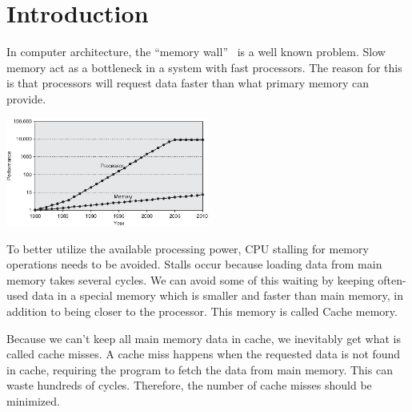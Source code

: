 \section{Introduction} %


In computer architecture, the ``memory wall''~\cite{wulf_mckee_1995}
is a well known problem. Slow memory act as a bottleneck in a system
with fast processors. The reason for this is that processors will
request data faster than what primary memory can provide. %

\begin{center}
  \includegraphics[width=0.5\textwidth]{graphs/memorywall}
\end{center}

To better utilize the available processing power, CPU stalling for
memory operations needs to be avoided. Stalls occur because loading
data from main memory takes several cycles. We can avoid some of this
waiting by keeping often-used data in a special memory which is
smaller and faster than main memory, in addition to being closer to
the processor. This memory is called Cache memory.

Because we can't keep all main memory data in cache, we inevitably get
what is called cache misses. A cache miss happens when the requested
data is not found in cache, requiring the program to fetch the data
from main memory. This can waste hundreds of cycles. Therefore, the
number of cache misses should be minimized.


